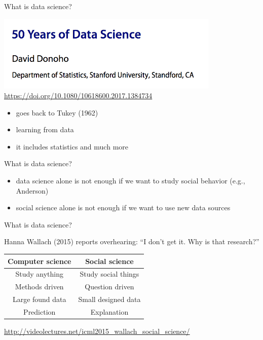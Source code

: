 \documentclass{beamer}
\def\vf{\vfill}
\begin{document}
\begin{frame}{What is data science?}

\begin{center}
\includegraphics[width=0.8\textwidth]{figures/donoho_50_2017_title.png}\\
\tiny{\textcolor{blue}{\url{https://doi.org/10.1080/10618600.2017.1384734 }}}
\end{center}
\vf
\begin{itemize}
\item goes back to Tukey (1962)
\item learning from data
\item it includes statistics and much more
\end{itemize}

\end{frame}
\begin{frame}{What is data science?}

\begin{itemize}
\item data science alone is not enough if we want to study social behavior (e.g., Anderson)
\item social science alone is not enough if we want to use new data sources
\end{itemize}

\end{frame}
\begin{frame}{What is data science?}

Hanna Wallach (2015) reports overhearing: ``I don't get it.  Why is that research?''\\
\vf
\begin{center}
\begin{tabular}{cc}
Computer science & Social science\\
\midrule
Study anything & Study social things\\
Methods driven & Question driven\\
Large found data & Small designed data\\
Prediction & Explanation\\
\end{tabular}
\end{center}

\vf
\tiny{\url{http://videolectures.net/icml2015_wallach_social_science/}}

\end{frame}
\end{document}
